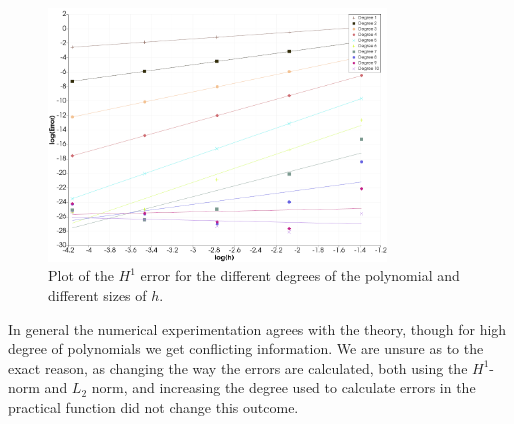 \begin{figure}
    \begin{centering}
    \includegraphics[width=0.8\textwidth]{Afsnit/Application/figurer/h1-fejl_plot.png}
    \caption{Plot of the $H^1$ error for the different degrees of the polynomial and different sizes of $h$.}
    \label{fig:h1-fejl-plot}
    \end{centering}
\end{figure}

In general the numerical experimentation agrees with the theory, though 
for high degree of polynomials we get conflicting information. We are unsure 
as to the exact reason, as changing the way the errors are calculated, both 
using the $H^1$-norm and $L_2$ norm, and increasing the degree used to calculate 
errors in the practical function did not change this outcome.